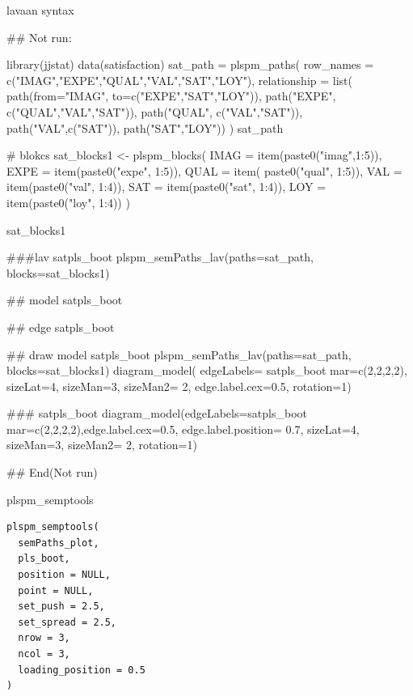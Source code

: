 \documentclass[a4paper]{book}
\begin{document}
%
\begin{Value}
lavaan syntax
\end{Value}
%
\begin{Examples}
\begin{ExampleCode}

\#\# Not run: 

library(jjstat)
data(satisfaction)
sat_path = plspm_paths(
  row_names = c("IMAG","EXPE","QUAL","VAL","SAT","LOY"),
  relationship = list(
    path(from="IMAG", to=c("EXPE","SAT","LOY")),
    path("EXPE", c("QUAL","VAL","SAT")),
    path("QUAL", c("VAL","SAT")),
    path("VAL",c("SAT")),
    path("SAT","LOY"))
)
sat_path

# blokcs
sat_blocks1 <- plspm_blocks(
  IMAG = item(paste0("imag",1:5)),
  EXPE = item(paste0("expe", 1:5)),
  QUAL = item( paste0("qual", 1:5)),
  VAL = item(paste0("val", 1:4)),
  SAT = item(paste0("sat", 1:4)),
  LOY = item(paste0("loy", 1:4))
)

sat_blocks1


###lav
satpls_boot%
  plspm_semPaths_lav(paths=sat_path, blocks=sat_blocks1)%

## model
satpls_boot%

## edge
satpls_boot%

## draw model
satpls_boot%
  plspm_semPaths_lav(paths=sat_path, blocks=sat_blocks1)%
  diagram_model(  edgeLabels= satpls_boot%
                  mar=c(2,2,2,2),
                  sizeLat=4, sizeMan=3, sizeMan2= 2, edge.label.cex=0.5, rotation=1)

###
satpls_boot%
  diagram_model(edgeLabels=satpls_boot%
                mar=c(2,2,2,2),edge.label.cex=0.5, edge.label.position= 0.7,
                sizeLat=4, sizeMan=3, sizeMan2= 2, rotation=1)


## End(Not run)


\end{ExampleCode}
\end{Examples}
%
\begin{Description}
plspm\_semptools
\end{Description}
%
\begin{Usage}
\begin{verbatim}
plspm_semptools(
  semPaths_plot,
  pls_boot,
  position = NULL,
  point = NULL,
  set_push = 2.5,
  set_spread = 2.5,
  nrow = 3,
  ncol = 3,
  loading_position = 0.5
)
\end{verbatim}
\end{Usage}
\end{document}
